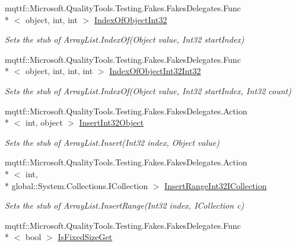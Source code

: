 \begin{DoxyCompactItemize}
mqttf\-::\-Microsoft.\-Quality\-Tools.\-Testing.\-Fakes.\-Fakes\-Delegates.\-Func\\*
$<$ object, int, int $>$ \hyperlink{class_system_1_1_collections_1_1_fakes_1_1_stub_array_list_aff4e3edbc43a2e425eef9251effa1fe3}{Index\-Of\-Object\-Int32}
\begin{DoxyCompactList}\small\item\em Sets the stub of Array\-List.\-Index\-Of(\-Object value, Int32 start\-Index)\end{DoxyCompactList}\item 
mqttf\-::\-Microsoft.\-Quality\-Tools.\-Testing.\-Fakes.\-Fakes\-Delegates.\-Func\\*
$<$ object, int, int, int $>$ \hyperlink{class_system_1_1_collections_1_1_fakes_1_1_stub_array_list_a1cccec7f46a34eed7f38d9f9b5761b90}{Index\-Of\-Object\-Int32\-Int32}
\begin{DoxyCompactList}\small\item\em Sets the stub of Array\-List.\-Index\-Of(\-Object value, Int32 start\-Index, Int32 count)\end{DoxyCompactList}\item 
mqttf\-::\-Microsoft.\-Quality\-Tools.\-Testing.\-Fakes.\-Fakes\-Delegates.\-Action\\*
$<$ int, object $>$ \hyperlink{class_system_1_1_collections_1_1_fakes_1_1_stub_array_list_aa183728851b0e108de162a622582adf8}{Insert\-Int32\-Object}
\begin{DoxyCompactList}\small\item\em Sets the stub of Array\-List.\-Insert(\-Int32 index, Object value)\end{DoxyCompactList}\item 
mqttf\-::\-Microsoft.\-Quality\-Tools.\-Testing.\-Fakes.\-Fakes\-Delegates.\-Action\\*
$<$ int, \\*
global\-::\-System.\-Collections.\-I\-Collection $>$ \hyperlink{class_system_1_1_collections_1_1_fakes_1_1_stub_array_list_aa1ebf69340a4c131331f366d3dc873c6}{Insert\-Range\-Int32\-I\-Collection}
\begin{DoxyCompactList}\small\item\em Sets the stub of Array\-List.\-Insert\-Range(\-Int32 index, I\-Collection c)\end{DoxyCompactList}\item 
mqttf\-::\-Microsoft.\-Quality\-Tools.\-Testing.\-Fakes.\-Fakes\-Delegates.\-Func\\*
$<$ bool $>$ \hyperlink{class_system_1_1_collections_1_1_fakes_1_1_stub_array_list_ac07fcf54b43a0fcdbbc3002905d1e733}{Is\-Fixed\-Size\-Get}

\end{DoxyCompactItemize}
